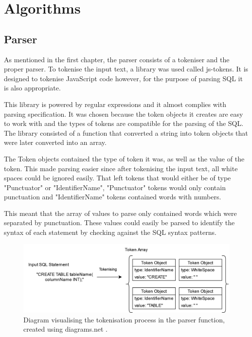 \newpage

\section{Algorithms}

\subsection{Parser}

As mentioned in the first chapter, the parser consists of a tokeniser and the proper parser. To tokenise the input text, a library was used called js-tokens\cite{tokeniser}. It is designed to tokenise JavaScript code however, for the purpose of parsing SQL it is also appropriate. 

This library is powered by regular expressions and it almost complies with parsing specification. It was chosen because the token objects it creates are easy to work with and the types of tokens are compatible for the parsing of the SQL. The library consisted of a function that converted a string into token objects that were later converted into an array. 

The Token objects contained the type of token it was, as well as the value of the token. This made parsing easier since after tokenising the input text, all white spaces could be ignored easily. That left tokens that would either be of type "Punctuator" or "IdentifierName", "Punctuator" tokens would only contain punctuation and "IdentifierName" tokens contained words with numbers. 

This meant that the array of values to parse only contained words which were separated by punctuation. These values could easily be parsed to identify the syntax of each statement by checking against the SQL syntax patterns.

\begin{figure}[h!]
	\centering
	\includegraphics[width = \textwidth]{tokenisingDiagram}
	\caption{Diagram visualising the tokenisation process in the parser function, created using diagrams.net \cite{dbdiagram}.}
	\label{fig:tokenisingDiagram}
\end{figure}

